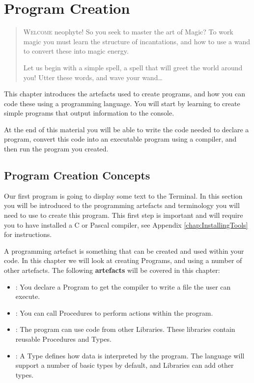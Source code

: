 \chapter{Program Creation} %
\label{cha:program_creation}

\begin{quote}
  \Fontlukas\Large
  \renewcommand{\LettrineTextFont}{\relax}
  \renewcommand{\LettrineFontHook}{\color{red}}
  \lettrine[image=true,lines=3,lhang=.2, loversize=.25, findent=0.1em]
  {W}{elcome} neophyte! So you seek to master the art of Magic? To work magic you must learn the structure of incantations, and how to use a wand to convert these into magic energy. 
  
  Let us begin with a simple spell, a spell that will greet the world around you! Utter these words, and wave your wand\ldots
\end{quote}

\bigskip

This chapter introduces the artefacts used to create programs, and how you can code these using a programming language. You will start by learning to create simple programs that output information to the console.

At the end of this material you will be able to write the code needed to declare a program, convert this code into an executable program using a compiler, and then run the program you created.

\minitoc

\clearpage
\section{Program Creation Concepts} %
\label{sec:program_creation_concepts}

Our first program is going to display some text to the Terminal. In this section you will be introduced to the programming artefacts and terminology you will need to use to create this program. This first step is important and will require you to have installed a C or Pascal compiler, see Appendix \ref{chap:InstallingTools} for instructions.

A programming artefact is something that can be created and used within your code. In this chapter we will look at creating Programs, and using a number of other artefacts. The following \textbf{artefacts} will be covered in this chapter:
\begin{itemize}
  \item {}: You declare a Program to get the compiler to write a file the user can execute.
  \item {}: You can call Procedures to perform actions within the program.
  \item {}: The program can use code from other Libraries. These libraries contain reusable Procedures and Types. 
  \item {}: A Type defines how data is interpreted by the program. The language will support a number of basic types by default, and Libraries can add other types. 
\end{itemize}

